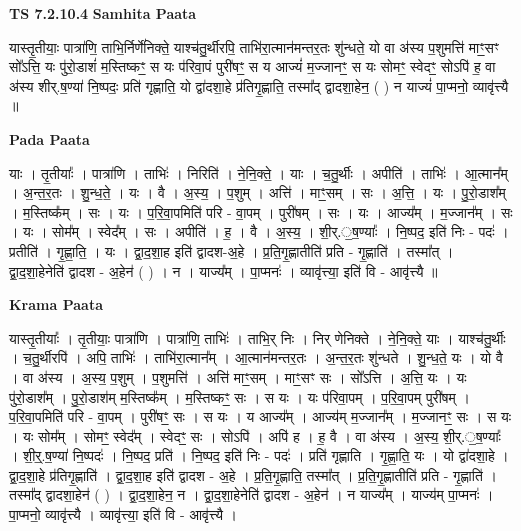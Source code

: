 \documentclass[17pt]{extarticle}
\begin{document}
\textbf{TS 7.2.10.4 } \newline
\textbf{Samhita Paata} \newline

यास्तृ॒तीयाः॒ पात्रा॑णि॒ ताभि॒र्निर्णे॑निक्ते॒ याश्च॑तु॒र्थीरपि॒ ताभि॑रा॒त्मान॑मन्तर॒तः शु॑न्धते॒ यो वा अ॑स्य प॒शुमत्ति॑ माꣳ॒॒सꣳ सो᳚ऽत्ति॒ यः पु॑रो॒डाशं॑ म॒स्तिष्कꣳ॒॒ स यः प॑रिवा॒पं पुरी॑षꣳ॒॒ स य आज्यं॑ म॒ज्जानꣳ॒॒ स यः सोमꣳ॒॒ स्वेदꣳ॒॒ सोऽपि॑ ह॒ वा अ॑स्य शीर्.ष॒ण्या॑ नि॒ष्पदः॒ प्रति॑ गृह्णाति॒ यो द्वा॑दशा॒हे प्र॑तिगृ॒ह्णाति॒ तस्मा᳚द् द्वादशा॒हेन॒ ( ) न याज्यं॑ पा॒प्मनो॒ व्यावृ॑त्त्यै ॥ \newline

\textbf{Pada Paata} \newline

याः । तृ॒तीयाः᳚ । पात्रा॑णि । ताभिः॑ । निरिति॑ । ने॒नि॒क्ते॒ । याः । च॒तु॒र्थीः । अपीति॑ । ताभिः॑ । आ॒त्मान᳚म् । अ॒न्त॒र॒तः । शु॒न्ध॒ते॒ । यः । वै । अ॒स्य॒ । प॒शुम् । अत्ति॑ । माꣳ॒॒सम् । सः । अ॒त्ति॒ । यः । पु॒रो॒डाश᳚म् । म॒स्तिष्क᳚म् । सः । यः । प॒रि॒वा॒पमिति॑ परि - वा॒पम् । पुरी॑षम् । सः । यः । आज्य᳚म् । म॒ज्जान᳚म् । सः । यः । सोम᳚म् । स्वेद᳚म् । सः । अपीति॑ । ह॒ । वै । अ॒स्य॒ । शी॒र्.॒ष॒ण्याः᳚ । नि॒ष्पद॒ इति॑ निः - पदः॑ । प्रतीति॑ । गृ॒ह्णा॒ति॒ । यः । द्वा॒द॒शा॒ह इति॑ द्वादश-अ॒हे । प्र॒ति॒गृ॒ह्णातीति॑ प्रति - गृ॒ह्णाति॑ । तस्मा᳚त् । द्वा॒द॒शा॒हेनेति॑ द्वादश - अ॒हेन॑ ( ) । न । याज्य᳚म् । पा॒प्मनः॑ । व्यावृ॑त्त्या॒ इति॑ वि - आवृ॑त्त्यै ॥  \newline


\textbf{Krama Paata} \newline

यास्तृ॒तीयाः᳚ । तृ॒तीयाः॒ पात्रा॑णि । पात्रा॑णि॒ ताभिः॑ । ताभि॒र् निः । निर् णेनिक्ते । ने॒नि॒क्ते॒ याः । याश्च॑तु॒र्थीः । च॒तु॒र्थीरपि॑ । अपि॒ ताभिः॑ । ताभि॑रा॒त्मान᳚म् । आ॒त्मान॑मन्तर॒तः । अ॒न्त॒र॒तः शु॑न्धते । शु॒न्ध॒ते॒ यः । यो वै । वा अ॑स्य । अ॒स्य॒ प॒शुम् । प॒शुमत्ति॑ । अत्ति॑ माꣳ॒॒सम् । माꣳ॒॒सꣳ सः । सो᳚ऽत्ति । अ॒त्ति॒ यः । यः पु॑रो॒डाश᳚म् । पु॒रो॒डाश॑म् म॒स्तिष्क᳚म् । म॒स्तिष्कꣳ॒॒ सः । स यः । यः प॑रिवा॒पम् । प॒रि॒वा॒पम् पुरी॑षम् । प॒रि॒वा॒पमिति॑ परि - वा॒पम् । पुरी॑षꣳ॒॒ सः । स यः । य आज्य᳚म् । आज्य॑म् म॒ज्जान᳚म् । म॒ज्जानꣳ॒॒ सः । स यः । यः सोम᳚म् । सोमꣳ॒॒ स्वेद᳚म् । स्वेदꣳ॒॒ सः । सोऽपि॑ । अपि॑ ह । ह॒ वै । वा अ॑स्य । अ॒स्य॒ शी॒र्.॒ष॒ण्याः᳚ । शी॒र्॒.ष॒ण्या॑ नि॒ष्पदः॑ । नि॒ष्पद॒ प्रति॑ । नि॒ष्पद॒ इति॑ निः - पदः॑ । प्रति॑ गृह्णाति । गृ॒ह्णा॒ति॒ यः । यो द्वा॑दशा॒हे । द्वा॒द॒शा॒हे प्र॑तिगृ॒ह्णाति॑ । द्वा॒द॒शा॒ह इति॑ द्वादश - अ॒हे । प्र॒ति॒गृ॒ह्णाति॒ तस्मा᳚त् । प्र॒ति॒गृ॒ह्णातीति॑ प्रति - गृ॒ह्णाति॑ । तस्मा᳚द् द्वादशा॒हेन॑ ( ) । द्वा॒द॒शा॒हेन॒ न । द्वा॒द॒शा॒हेनेति॑ द्वादश - अ॒हेन॑ । न याज्य᳚म् । याज्य॑म् पा॒प्मनः॑ । पा॒प्मनो॒ व्यावृ॑त्त्यै । व्यावृ॑त्त्या॒ इति॑ वि - आवृ॑त्त्यै । \newline
\end{document}
